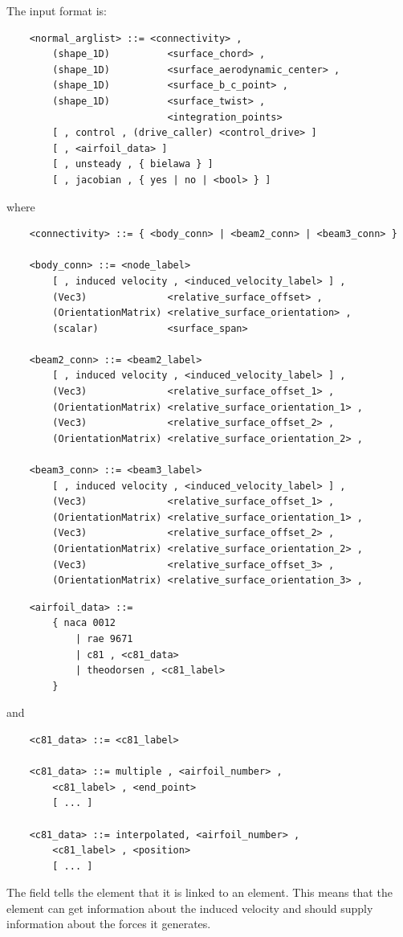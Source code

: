 The input format is:
\begin{verbatim}
    <normal_arglist> ::= <connectivity> ,
        (shape_1D)          <surface_chord> ,
        (shape_1D)          <surface_aerodynamic_center> ,
        (shape_1D)          <surface_b_c_point> ,
        (shape_1D)          <surface_twist> ,
                            <integration_points>
        [ , control , (drive_caller) <control_drive> ] 
        [ , <airfoil_data> ]
        [ , unsteady , { bielawa } ]
        [ , jacobian , { yes | no | <bool> } ]
\end{verbatim}
where
\begin{verbatim}
    <connectivity> ::= { <body_conn> | <beam2_conn> | <beam3_conn> }

    <body_conn> ::= <node_label> 
        [ , induced velocity , <induced_velocity_label> ] ,
        (Vec3)              <relative_surface_offset> , 
        (OrientationMatrix) <relative_surface_orientation> ,
        (scalar)            <surface_span>

    <beam2_conn> ::= <beam2_label> 
        [ , induced velocity , <induced_velocity_label> ] ,
        (Vec3)              <relative_surface_offset_1> ,       
        (OrientationMatrix) <relative_surface_orientation_1> ,
        (Vec3)              <relative_surface_offset_2> ,
        (OrientationMatrix) <relative_surface_orientation_2> ,

    <beam3_conn> ::= <beam3_label> 
        [ , induced velocity , <induced_velocity_label> ] ,
        (Vec3)              <relative_surface_offset_1> ,       
        (OrientationMatrix) <relative_surface_orientation_1> ,
        (Vec3)              <relative_surface_offset_2> ,
        (OrientationMatrix) <relative_surface_orientation_2> ,
        (Vec3)              <relative_surface_offset_3> ,       
        (OrientationMatrix) <relative_surface_orientation_3> ,
\end{verbatim}
\begin{verbatim}
    <airfoil_data> ::=
        { naca 0012
            | rae 9671
            | c81 , <c81_data>
            | theodorsen , <c81_label>
        }
\end{verbatim}
and
\begin{verbatim}
    <c81_data> ::= <c81_label> 

    <c81_data> ::= multiple , <airfoil_number> ,
        <c81_label> , <end_point>
        [ ... ]

    <c81_data> ::= interpolated, <airfoil_number> ,
        <c81_label> , <position>
        [ ... ]
\end{verbatim}
The field  tells the element that it is linked to an
 element.
This means that the element can get information about the
induced velocity and should supply information about the forces it generates.

